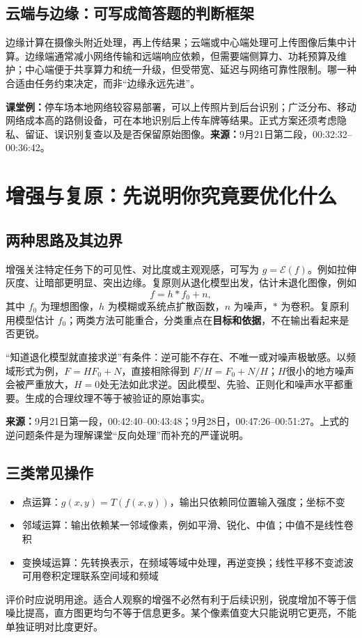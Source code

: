 \subsection{云端与边缘：可写成简答题的判断框架}
边缘计算在摄像头附近处理，再上传结果；云端或中心端处理可上传图像后集中计算。边缘端通常减小网络传输和远端响应依赖，但需要端侧算力、功耗预算及维护；中心端便于共享算力和统一升级，但受带宽、延迟与网络可靠性限制。哪一种合适由任务约束决定，而非“边缘永远先进”。

\textbf{课堂例：}停车场本地网络较容易部署，可以上传照片到后台识别；广泛分布、移动网络成本高的路侧设备，可在本地识别后上传车牌等结果。正式方案还须考虑隐私、留证、误识别复查以及是否保留原始图像。\textbf{来源：}9月21日第二段，00:32:32--00:36:42。

\section{增强与复原：先说明你究竟要优化什么}
\subsection{两种思路及其边界}
增强关注特定任务下的可见性、对比度或主观观感，可写为 $g=\mathcal E(f)$。例如拉伸灰度、让暗部更明显、突出边缘。复原则从退化模型出发，估计未退化图像，例如
\begin{equation}
f=h*f_0+n,
\end{equation}
其中 $f_0$ 为理想图像，$h$ 为模糊或系统点扩散函数，$n$ 为噪声，$*$ 为卷积。复原利用模型估计 $f_0$；两类方法可能重合，分类重点在\textbf{目标和依据}，不在输出看起来是否更锐。

“知道退化模型就直接求逆”有条件：逆可能不存在、不唯一或对噪声极敏感。以频域形式为例，$F=HF_0+N$，直接相除得到 $F/H=F_0+N/H$；$H$很小的地方噪声会被严重放大，$H=0$处无法如此求逆。因此模型、先验、正则化和噪声水平都重要。生成的合理纹理不等于被验证的原始事实。

\noindent\textbf{来源：}9月21日第一段，00:42:40--00:43:48；9月28日，00:47:26--00:51:27。上式的逆问题条件是为理解课堂“反向处理”而补充的严谨说明。

\subsection{三类常见操作}
\begin{itemize}
\item 点运算：$g(x,y)=T(f(x,y))$，输出只依赖同位置输入强度；坐标不变
\item 邻域运算：输出依赖某一邻域像素，例如平滑、锐化、中值；中值不是线性卷积
\item 变换域运算：先转换表示，在频域等域中处理，再逆变换；线性平移不变滤波可用卷积定理联系空间域和频域
\end{itemize}
评价时应说明用途。适合人观察的增强不必然有利于后续识别，锐度增加不等于信噪比提高，直方图更均匀不等于信息更多。某个像素值变大只能说明它更亮，不能单独证明对比度更好。

